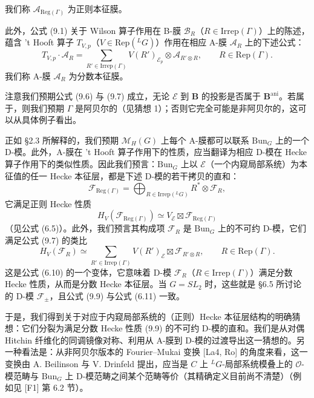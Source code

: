 \documentclass[11pt,a4paper]{article}
\newcommand{\Bun}{\mathrm{Bun}}
\begin{document}

我们称 $\mathcal{A}_{\mathrm{Reg}(\Gamma)}$ 为正则本征膜。

此外，公式 (9.1) 关于 Wilson 算子作用在 B-膜 $\mathcal{B}_R$（$R\in\mathrm{Irrep}(\Gamma)$）上的陈述，蕴含 't Hooft 算子 $T_{V,p}$（$V\in\mathrm{Rep}({}^{L}G)$）作用在相应 A-膜 $\mathcal{A}_R$ 上的下述公式：
\begin{equation}\tag{9.7}
T_{V,p}\cdot\mathcal{A}_R = \sum_{R'\in\mathrm{Irrep}(\Gamma)}V(R')_{\mathcal{E}_p}\otimes\mathcal{A}_{R'\otimes R},
\qquad R\in\mathrm{Rep}(\Gamma).
\end{equation}
我们称 A-膜 $\mathcal{A}_R$ 为分数本征膜。

注意我们预期公式 (9.6) 与 (9.7) 成立，无论 $\mathcal{E}$ 到 $\boldsymbol{B}$ 的投影是否属于 $\boldsymbol{B}^{\mathrm{ani}}$。若属于，则我们预期 $\Gamma$ 是阿贝尔的（见猜想 1）；否则它完全可能是非阿贝尔的，这可以从具体例子看出。

正如 §2.3 所解释的，我们预期 $\mathcal{M}_H(G)$ 上每个 A-膜都可以联系 $\Bun_G$ 上的一个 D-模。此外，A-膜在 't Hooft 算子作用下的性质，应当翻译为相应 D-模在 Hecke 算子作用下的类似性质。因此我们预言：$\Bun_G$ 上以 $\mathcal{E}$（一个内窥局部系统）为本征值的任一 Hecke 本征层，都是下述 D-模的若干拷贝的直和：
\begin{equation}\tag{9.8}
\mathcal{F}_{\mathrm{Reg}(\Gamma)} = \bigoplus_{R\in\mathrm{Irrep}({}^{L}G)}R^*\otimes\mathcal{F}_R,
\end{equation}
它满足正则 Hecke 性质
\[
H_V(\mathcal{F}_{\mathrm{Reg}(\Gamma)})\simeq V_{\mathcal{E}}\boxtimes\mathcal{F}_{\mathrm{Reg}(\Gamma)}
\]
（见公式 (6.5)）。此外，我们预言其构成项 $\mathcal{F}_R$ 是 $\Bun_G$ 上的不可约 D-模，它们满足公式 (9.7) 的类比
\begin{equation}\tag{9.9}
H_V(\mathcal{F}_R)\simeq\sum_{R'\in\mathrm{Irrep}(\Gamma)}V(R')_{\mathcal{E}}\boxtimes\mathcal{F}_{R'\otimes R},
\qquad R\in\mathrm{Rep}(\Gamma).
\end{equation}
这是公式 (6.10) 的一个变体，它意味着 D-模 $\mathcal{F}_R$（$R\in\mathrm{Irrep}(\Gamma)$）满足分数 Hecke 性质，从而是分数 Hecke 本征层。当 $G=SL_2$ 时，这些就是 §6.5 所讨论的 D-模 $\mathcal{F}_\pm$，且公式 (9.9) 与公式 (6.11) 一致。

于是，我们得到关于对应于内窥局部系统的（正则）Hecke 本征层结构的明确猜想：它们分裂为满足分数 Hecke 性质 (9.9) 的不可约 D-模的直和。我们是从对偶 Hitchin 纤维化的同调镜像对称、利用从 A-膜到 D-模的过渡导出这一猜想的。另一种看法是：从非阿贝尔版本的 Fourier--Mukai 变换 [La4, Ro] 的角度来看，这一变换由 A. Beilinson 与 V. Drinfeld 提出，应当是 $C$ 上 ${}^{L}G$-局部系统模叠上的 $\mathcal{O}$-模范畴与 $\Bun_G$ 上 D-模范畴之间某个范畴等价（其精确定义目前尚不清楚）（例如见 [F1] 第 6.2 节）。
\end{document}
